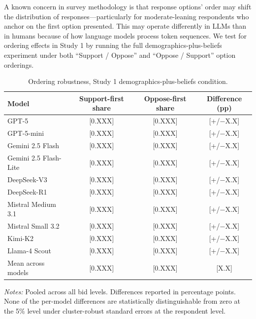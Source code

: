 \documentclass[12pt]{article}
\begin{document}
A known concern in survey methodology is that response options' order may shift the distribution of responses---particularly for moderate-leaning respondents who anchor on the first option presented. This may operate differently in LLMs than in humans because of how language models process token sequences. We test for ordering effects in Study 1 by running the full demographics-plus-beliefs experiment under both ``Support / Oppose'' and ``Oppose / Support'' option orderings.

\begin{table}[h]
    \centering
    \caption{Ordering robustness, Study 1 demographics-plus-beliefs condition.}
    \label{tab:order-bias}
    \begin{threeparttable}
    \begin{tabular}{lccc}
        \toprule
        Model & Support-first share & Oppose-first share & Difference (pp) \\
        \midrule
        GPT-5                  & [0.XXX] & [0.XXX] & [+/$-$X.X] \\
        GPT-5-mini             & [0.XXX] & [0.XXX] & [+/$-$X.X] \\
        Gemini 2.5 Flash       & [0.XXX] & [0.XXX] & [+/$-$X.X] \\
        Gemini 2.5 Flash-Lite  & [0.XXX] & [0.XXX] & [+/$-$X.X] \\
        DeepSeek-V3            & [0.XXX] & [0.XXX] & [+/$-$X.X] \\
        DeepSeek-R1            & [0.XXX] & [0.XXX] & [+/$-$X.X] \\
        Mistral Medium 3.1     & [0.XXX] & [0.XXX] & [+/$-$X.X] \\
        Mistral Small 3.2      & [0.XXX] & [0.XXX] & [+/$-$X.X] \\
        Kimi-K2                & [0.XXX] & [0.XXX] & [+/$-$X.X] \\
        Llama-4 Scout          & [0.XXX] & [0.XXX] & [+/$-$X.X] \\
        \midrule
        Mean across models     & [0.XXX] & [0.XXX] & [X.X]      \\
        \bottomrule
    \end{tabular}
    \begin{tablenotes}\footnotesize
        \item \textit{Notes:} Pooled across all bid levels. Differences reported in percentage points. None of the per-model differences are statistically distinguishable from zero at the 5\% level under cluster-robust standard errors at the respondent level.
    \end{tablenotes}
    \end{threeparttable}
\end{table}
\end{document}
